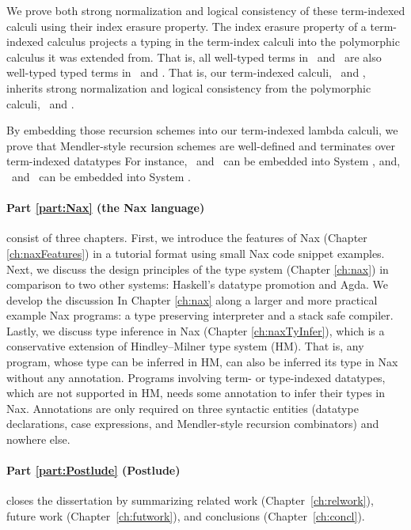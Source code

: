 We prove both strong normalization and logical consistency of
these term-indexed calculi using their index erasure property.
The index erasure property of a term-indexed calculus
projects a typing in the term-index calculi into
the polymorphic calculus it was extended from.
That is, all well-typed terms in \Fi\ and \Fixi\ are
also well-typed typed terms in \Fw\ and \Fixw.
That is, our term-indexed calculi, \Fi\ and \Fixi,
inherits strong normalization and logical consistency
from the polymorphic calculi, \Fw\ and \Fixw.

By embedding those recursion schemes into our term-indexed lambda calculi,
we prove that Mendler-style recursion schemes are well-defined and
terminates over term-indexed datatypes  For instance,
\MIt\ and \MsfIt\ can be embedded into System \Fi,
and, \MPr\ and \McvPr\ can be embedded into System \Fixi.

\paragraph{Part \ref{part:Nax} (the Nax language)}\hspace{-1em} consist of
three chapters.
First, we introduce the features of Nax (Chapter \ref{ch:naxFeatures})
in a tutorial format using small Nax code snippet examples.
Next, we discuss the design principles of the type system (Chapter \ref{ch:nax})
in comparison to two other systems: Haskell's datatype promotion and Agda.
We develop the discussion In Chapter \ref{ch:nax} along
a larger and more practical example Nax programs:
a type preserving interpreter and a stack safe compiler.
Lastly, we discuss type inference in Nax (Chapter \ref{ch:naxTyInfer}),
which is a conservative extension of Hindley--Milner type system (HM).
That is, any program, whose type can be inferred in HM, can also be
inferred its type in Nax without any annotation. Programs involving
term- or type-indexed datatypes, which are not supported in HM, needs
some annotation to infer their types in Nax. Annotations are only
required on three syntactic entities (datatype declarations, case expressions,
and Mendler-style recursion combinators) and nowhere else.

\paragraph{Part \ref{part:Postlude} (Postlude)}\hspace{-1em} closes
the dissertation by summarizing
  related work (Chapter~\ref{ch:relwork}),
  future work (Chapter~\ref{ch:futwork}), and
  conclusions (Chapter~\ref{ch:concl}).

